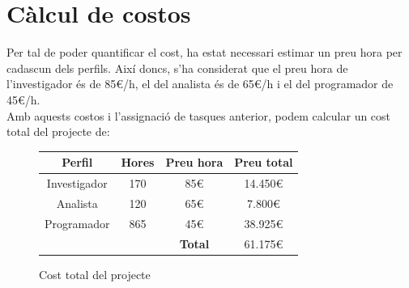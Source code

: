 \section{Càlcul de costos}

Per tal de poder quantificar el cost, ha estat necessari estimar un preu hora per
cadascun dels perfils. Així doncs, s'ha considerat que el preu hora de l'investigador és de 85\euro/h,
el del analista és de 65\euro/h i el del programador de 45\euro/h. \\

Amb aquests costos i l'assignació de tasques anterior, podem calcular un cost total del projecte de:

\begin{figure}[htp]
\centering
\begin{tabular}{c c c c}
	\textbf{Perfil} & \textbf{Hores} & \textbf{Preu hora} & \textbf{Preu total} \\
	\hline
	Investigador & 170 & 85\euro & 14.450\euro \\
	Analista & 120 & 65\euro & 7.800\euro \\
	Programador & 865 & 45\euro & 38.925\euro \\
	& & \textbf{Total} & 61.175\euro \\
\end{tabular}
\caption{Cost total del projecte}
\label{fig:costProjecte}
\end{figure}


